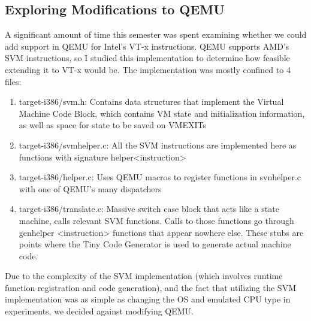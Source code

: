 \documentclass[11pt]{article}
\begin{document}
\subsection{Exploring Modifications to QEMU}
A significant amount of time this semester was spent examining whether we could
add support in QEMU for Intel's VT-x instructions. QEMU supports AMD's SVM
instructions, so I studied this implementation to determine how feasible
extending it to VT-x would be. The implementation was mostly confined to 4
files:
\begin{enumerate}
\item target-i386/svm.h: Contains data structures that implement the Virtual
Machine Code Block, which contains VM state and initialization information, as
well as space for state to be saved on VMEXITs
\item target-i386/svm\textunderscore helper.c: All the SVM instructions are implemented here as
functions with signature helper\textunderscore <instruction>
\item target-i386/helper.c: Uses QEMU macros to register functions in
svn\textunderscore helper.c with one of QEMU's many dispatchers
\item target-i386/translate.c: Massive switch case block that acts like a state
machine, calls relevant SVM functions. Calls to those functions go through
gen\textunderscore helper \textunderscore <instruction> functions that appear
nowhere else. These stubs are points where the Tiny Code Generator is used to
generate actual machine code. 
\end{enumerate}
Due to the complexity of the SVM implementation (which
involves runtime function registration and code generation), and the fact that
utilizing the SVM implementation was as simple as changing the OS and emulated
CPU type in experiments, we decided against modifying QEMU.
\end{document}
